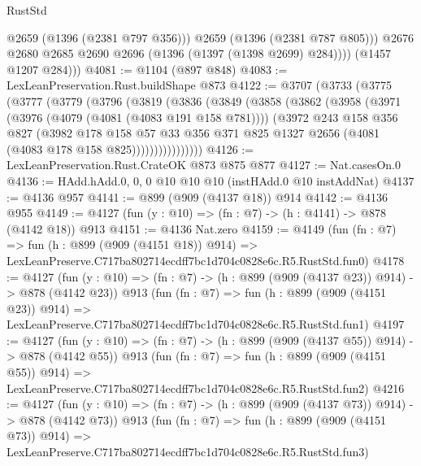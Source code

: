 \begin{lexlean}{RustStd}
\begin{coremodule}
                @2659
                (@1396 (@2381 @797 @356)))
              @2659
              (@1396 (@2381 @787 @805)))
            @2676
            @2680
            @2685
            @2690
            @2696
            (@1396 (@1397 (@1398 @2699) @284))))
        (@1457 @1207 @284)))
@4081 := @1104 (@897 @848)
@4083 := LexLeanPreservation.Rust.buildShape @873
@4122 := @3707
    (@3733
      (@3775
        (@3777
          (@3779
            (@3796
              (@3819
                (@3836
                  (@3849
                    (@3858
                      (@3862
                        (@3958
                          (@3971
                            (@3976 (@4079 (@4081 (@4083 @191 @158 @781))))
                            (@3972
                              @243
                              @158
                              @356
                              @827
                              (@3982
                                @178
                                @158
                                @57
                                @33
                                @356
                                @371
                                @825
                                @1327
                                @2656
                                (@4081 (@4083 @178 @158 @825))))))))))))))))
@4126 := LexLeanPreservation.Rust.CrateOK @873 @875 @877
@4127 := Nat.casesOn.{0}
@4136 := HAdd.hAdd.{0, 0, 0} @10 @10 @10 (instHAdd.{0} @10 instAddNat)
@4137 := @4136 @957
@4141 := @899 (@909 (@4137 @18)) @914
@4142 := @4136 @955
@4149 := @4127 (fun (y : @10) => (fn : @7) -> (h : @4141) -> @878 (@4142 @18)) @913
@4151 := @4136 Nat.zero
@4159 := @4149
    (fun (fn : @7) =>
    fun (h : @899 (@909 (@4151 @18)) @914) =>
    LexLeanPreserve.C717ba802714ecdff7bc1d704c0828e6c.R5.RustStd.fun0)
@4178 := @4127
    (fun (y : @10) => (fn : @7) -> (h : @899 (@909 (@4137 @23)) @914) -> @878 (@4142 @23))
    @913
    (fun (fn : @7) =>
    fun (h : @899 (@909 (@4151 @23)) @914) =>
    LexLeanPreserve.C717ba802714ecdff7bc1d704c0828e6c.R5.RustStd.fun1)
@4197 := @4127
    (fun (y : @10) => (fn : @7) -> (h : @899 (@909 (@4137 @55)) @914) -> @878 (@4142 @55))
    @913
    (fun (fn : @7) =>
    fun (h : @899 (@909 (@4151 @55)) @914) =>
    LexLeanPreserve.C717ba802714ecdff7bc1d704c0828e6c.R5.RustStd.fun2)
@4216 := @4127
    (fun (y : @10) => (fn : @7) -> (h : @899 (@909 (@4137 @73)) @914) -> @878 (@4142 @73))
    @913
    (fun (fn : @7) =>
    fun (h : @899 (@909 (@4151 @73)) @914) =>
    LexLeanPreserve.C717ba802714ecdff7bc1d704c0828e6c.R5.RustStd.fun3)

\end{coremodule}
\end{lexlean}
